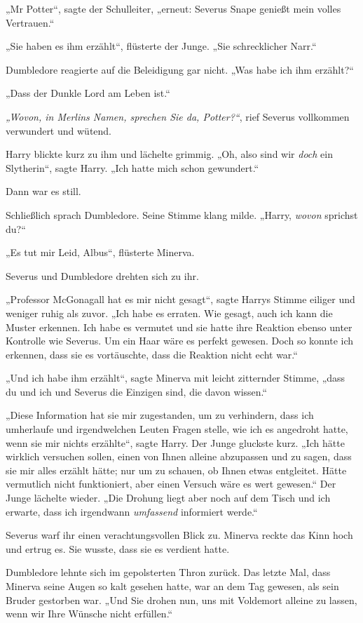 {„Mr Potter“, sagte der Schulleiter, „erneut: Severus Snape genießt mein volles Vertrauen.“

„Sie haben es ihm erzählt“, flüsterte der Junge. „Sie schrecklicher Narr.“

Dumbledore reagierte auf die Beleidigung gar nicht. „Was habe ich ihm erzählt?“

„Dass der Dunkle Lord am Leben ist.“

\emph{„Wovon, in Merlins Namen, sprechen Sie da, Potter?“}, rief Severus vollkommen verwundert und wütend.

Harry blickte kurz zu ihm und lächelte grimmig. „Oh, also sind wir \emph{doch} ein Slytherin“, sagte Harry. „Ich hatte mich schon gewundert.“

Dann war es still.

Schließlich sprach Dumbledore. Seine Stimme klang milde. „Harry, \emph{wovon} sprichst du?“

„Es tut mir Leid, Albus“, flüsterte Minerva.

Severus und Dumbledore drehten sich zu ihr.

„Professor McGonagall hat es mir nicht gesagt“, sagte Harrys Stimme eiliger und weniger ruhig als zuvor. „Ich habe es erraten. Wie gesagt, auch ich kann die Muster erkennen. Ich habe es vermutet und sie hatte ihre Reaktion ebenso unter Kontrolle wie Severus. Um ein Haar wäre es perfekt gewesen. Doch so konnte ich erkennen, dass sie es vortäuschte, dass die Reaktion nicht echt war.“

„Und ich habe ihm erzählt“, sagte Minerva mit leicht zitternder Stimme, „dass du und ich und Severus die Einzigen sind, die davon wissen.“

„Diese Information hat sie mir zugestanden, um zu verhindern, dass ich umherlaufe und irgendwelchen Leuten Fragen stelle, wie ich es angedroht hatte, wenn sie mir nichts erzählte“, sagte Harry. Der Junge gluckste kurz. „Ich hätte wirklich versuchen sollen, einen von Ihnen alleine abzupassen und zu sagen, dass sie mir alles erzählt hätte; nur um zu schauen, ob Ihnen etwas entgleitet. Hätte vermutlich nicht funktioniert, aber einen Versuch wäre es wert gewesen.“ Der Junge lächelte wieder. „Die Drohung liegt aber noch auf dem Tisch und ich erwarte, dass ich irgendwann \emph{umfassend} informiert werde.“

Severus warf ihr einen verachtungsvollen Blick zu. Minerva reckte das Kinn hoch und ertrug es. Sie wusste, dass sie es verdient hatte.

Dumbledore lehnte sich im gepolsterten Thron zurück. Das letzte Mal, dass Minerva seine Augen so kalt gesehen hatte, war an dem Tag gewesen, als sein Bruder gestorben war. „Und Sie drohen nun, uns mit Voldemort alleine zu lassen, wenn wir Ihre Wünsche nicht erfüllen.“

}
